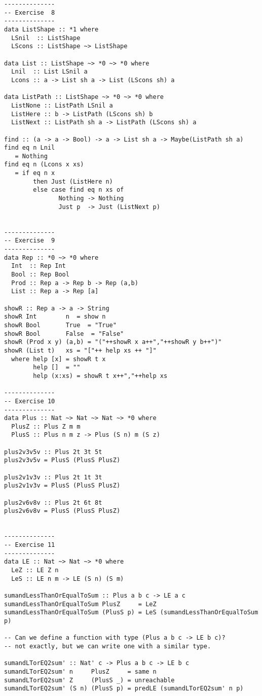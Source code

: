 \documentclass[11pt,twoside,A4]{llncs}
\begin{document}
{\begin{verbatim}
--------------
-- Exercise  8
--------------
data ListShape :: *1 where
  LSnil  :: ListShape
  LScons :: ListShape ~> ListShape

data List :: ListShape ~> *0 ~> *0 where
  Lnil  :: List LSnil a
  Lcons :: a -> List sh a -> List (LScons sh) a

data ListPath :: ListShape ~> *0 ~> *0 where
  ListNone :: ListPath LSnil a
  ListHere :: b -> ListPath (LScons sh) b
  ListNext :: ListPath sh a -> ListPath (LScons sh) a

find :: (a -> a -> Bool) -> a -> List sh a -> Maybe(ListPath sh a)
find eq n Lnil         
   = Nothing
find eq n (Lcons x xs) 
   = if eq n x 
        then Just (ListHere n)
        else case find eq n xs of
               Nothing -> Nothing
               Just p  -> Just (ListNext p)


--------------
-- Exercise  9
--------------
data Rep :: *0 ~> *0 where
  Int  :: Rep Int
  Bool :: Rep Bool
  Prod :: Rep a -> Rep b -> Rep (a,b)
  List :: Rep a -> Rep [a]

showR :: Rep a -> a -> String
showR Int        n  = show n
showR Bool       True  = "True"
showR Bool       False  = "False"
showR (Prod x y) (a,b) = "("++showR x a++","++showR y b++")"
showR (List t)   xs = "["++ help xs ++ "]"
  where help [x] = showR t x
        help []  = ""
        help (x:xs) = showR t x++","++help xs

--------------
-- Exercise 10
--------------
data Plus :: Nat ~> Nat ~> Nat ~> *0 where
  PlusZ :: Plus Z m m
  PlusS :: Plus n m z -> Plus (S n) m (S z)

plus2v3v5v :: Plus 2t 3t 5t
plus2v3v5v = PlusS (PlusS PlusZ)

plus2v1v3v :: Plus 2t 1t 3t
plus2v1v3v = PlusS (PlusS PlusZ)

plus2v6v8v :: Plus 2t 6t 8t
plus2v6v8v = PlusS (PlusS PlusZ)


--------------
-- Exercise 11
--------------
data LE :: Nat ~> Nat ~> *0 where
  LeZ :: LE Z n
  LeS :: LE n m -> LE (S n) (S m)

sumandLessThanOrEqualToSum :: Plus a b c -> LE a c
sumandLessThanOrEqualToSum PlusZ     = LeZ
sumandLessThanOrEqualToSum (PlusS p) = LeS (sumandLessThanOrEqualToSum p)

-- Can we define a function with type (Plus a b c -> LE b c)?
-- not exactly, but we can write one with a similar type.

sumandLTorEQ2sum' :: Nat' c -> Plus a b c -> LE b c
sumandLTorEQ2sum' n     PlusZ     = same n
sumandLTorEQ2sum' Z     (PlusS _) = unreachable
sumandLTorEQ2sum' (S n) (PlusS p) = predLE (sumandLTorEQ2sum' n p)


\end{verbatim}}
\end{document}
